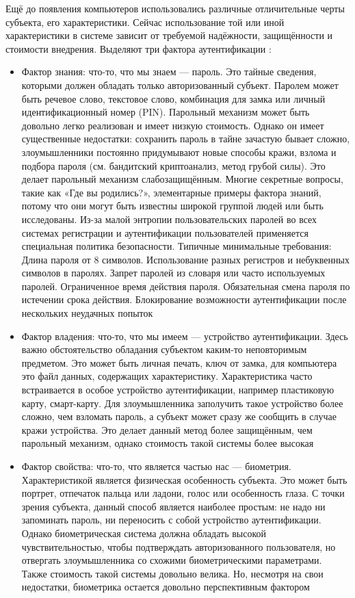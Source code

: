 Ещё до появления компьютеров использовались различные отличительные черты субъекта, его
характеристики. Сейчас использование той или иной характеристики в системе зависит от требуемой
надёжности, защищённости и стоимости внедрения. Выделяют три фактора аутентификации \cite{crypto-methods}:
\begin{itemize}
    \item Фактор знания: что-то, что мы знаем — пароль. Это тайные сведения, которыми должен
        обладать только авторизованный субъект. Паролем может быть речевое слово, текстовое слово,
        комбинация для замка или личный идентификационный номер (PIN). Парольный механизм может
        быть довольно легко реализован и имеет низкую стоимость. Однако он имеет существенные
        недостатки: сохранить пароль в тайне зачастую бывает сложно, злоумышленники постоянно
        придумывают новые способы кражи, взлома и подбора пароля (см. бандитский криптоанализ,
        метод грубой силы). Это делает парольный механизм слабозащищённым. Многие секретные
        вопросы, такие как «Где вы родились?», элементарные примеры фактора знаний, потому что они
        могут быть известны широкой группой людей или быть исследованы. Из-за малой энтропии
        пользовательских паролей во всех системах регистрации и аутентификации пользователей
        применяется специальная политика безопасности. Типичные минимальные требования: Длина
        пароля от 8 символов. Использование разных регистров и небуквенных символов в паролях.
        Запрет паролей из словаря или часто используемых паролей. Ограниченное время действия
        пароля. Обязательная смена пароля по истечении срока действия. Блокирование возможности
        аутентификации после нескольких неудачных попыток
    \item Фактор владения: что-то, что мы имеем — устройство аутентификации. Здесь важно
        обстоятельство обладания субъектом каким-то неповторимым предметом. Это может быть личная
        печать, ключ от замка, для компьютера это файл данных, содержащих характеристику.
        Характеристика часто встраивается в особое устройство аутентификации, например пластиковую
        карту, смарт-карту. Для злоумышленника заполучить такое устройство более сложно, чем взломать
        пароль, а субъект может сразу же сообщить в случае кражи устройства. Это делает данный метод
        более защищённым, чем парольный механизм, однако стоимость такой системы более высокая
    \item Фактор свойства: что-то, что является частью нас — биометрия. Характеристикой является
        физическая особенность субъекта. Это может быть портрет, отпечаток пальца или ладони, голос или
        особенность глаза. С точки зрения субъекта, данный способ является наиболее простым: не надо ни
        запоминать пароль, ни переносить с собой устройство аутентификации. Однако биометрическая
        система должна обладать высокой чувствительностью, чтобы подтверждать авторизованного
        пользователя, но отвергать злоумышленника со схожими биометрическими параметрами. Также
        стоимость такой системы довольно велика. Но, несмотря на свои недостатки, биометрика
        остается довольно перспективным фактором
\end{itemize}


